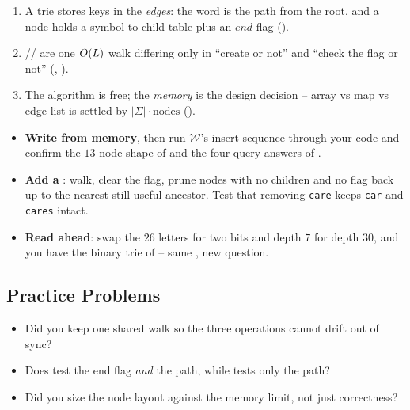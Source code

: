 \begin{insightbox}
\begin{enumerate}[nosep, leftmargin=1.6em]
  \item A trie stores keys in the \emph{edges}: the word is the path from the root, and a node holds a
        symbol-to-child table plus an $\mathit{end}$ flag ().
  \item {}// are one $O(L)$ walk differing only in
        ``create or not'' and ``check the flag or not'' (, ).
  \item The algorithm is free; the \emph{memory} is the design decision -- array vs map vs edge list is
        settled by $|\Sigma|\cdot\text{nodes}$ ().
\end{enumerate}
\end{insightbox}

\begin{hardeningbox}
\begin{itemize}[nosep, leftmargin=1.4em]
  \item \textbf{Write  from memory}, then run $\mathcal{W}$'s insert sequence through
        your code and confirm the $13$-node shape of  and the four query answers of
        .
  \item \textbf{Add a }: walk, clear the flag, prune nodes with no children and no
        flag back up to the nearest still-useful ancestor. Test that removing \texttt{care} keeps
        \texttt{car} and \texttt{cares} intact.
  \item \textbf{Read ahead}: swap the $26$ letters for two bits and depth $7$ for depth $30$, and you have
        the binary trie of  -- same , new question.
\end{itemize}
\end{hardeningbox}

\subsection{Practice Problems}

\begin{stuckbox}
\begin{itemize}[nosep, leftmargin=1.4em]
  \item Did you keep one shared walk so the three operations cannot drift out of sync?
  \item Does  test the end flag \emph{and} the path, while  tests only the path?
  \item Did you size the node layout against the memory limit, not just correctness?
\end{itemize}
\end{stuckbox}

